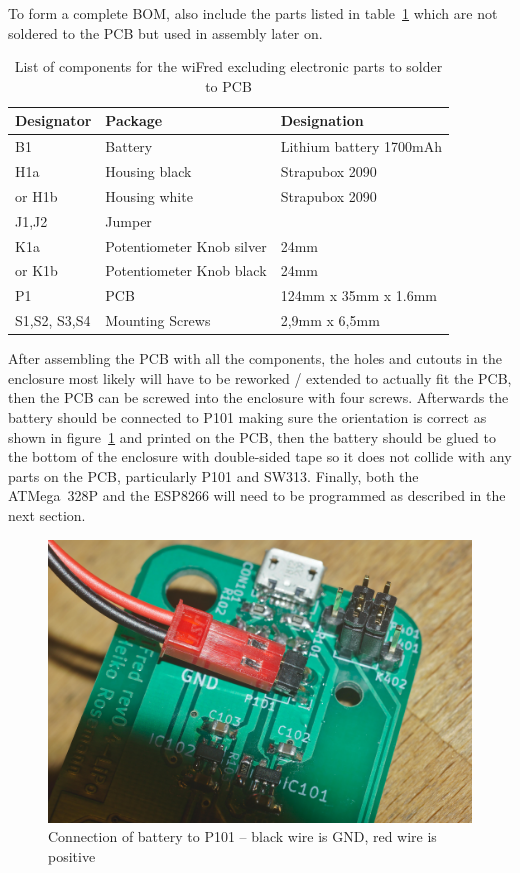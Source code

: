 \documentclass[11pt,a4paper]{scrartcl}
\begin{document}
To form a complete BOM, also include the parts listed in table~\ref{wiFredBOMextra} which are not soldered to the PCB but used in assembly later on.

\begin{table}
  \caption{List of components for the wiFred excluding electronic parts to solder to PCB} \label{wiFredBOMextra}
  
  \vspace{0.5em}

  \centering
  \begin{footnotesize}
    \begin{tabular}{|m{5em}|l|l|}
      \hline
      Designator & Package & Designation \\
      \hline
      B1 & Battery & Lithium battery 1700mAh \\
      H1a & Housing black & Strapubox 2090 \\
      or H1b & Housing white & Strapubox 2090 \\
      J1,J2 & Jumper & \\
      K1a & Potentiometer Knob silver & 24mm \\
      or K1b & Potentiometer Knob black & 24mm \\
      P1 & PCB & 124mm x 35mm x 1.6mm \\
      S1,S2, S3,S4 & Mounting Screws & 2,9mm x 6,5mm \\
      \hline
    \end{tabular}
  \end{footnotesize}
\end{table}

After assembling the PCB with all the components, the holes and cutouts in the enclosure most likely will have to be reworked / extended to actually fit the PCB, then the PCB can be screwed into the enclosure with four screws. Afterwards the battery should be connected to P101 making sure the orientation is correct as shown in figure~\ref{battConnection} and printed on the PCB, then the battery should be glued to the bottom of the enclosure with double-sided tape so it does not collide with any parts on the PCB, particularly P101 and SW313. Finally, both the ATMega~328P and the ESP8266 will need to be programmed as described in the next section.

\begin{figure}[tbhp]
  \centering
  \includegraphics[width=0.8 \textwidth]{images/_DSC0148}
  \caption{Connection of battery to P101 -- black wire is GND, red wire is positive}
  \label{battConnection}
\end{figure}
\end{document}
